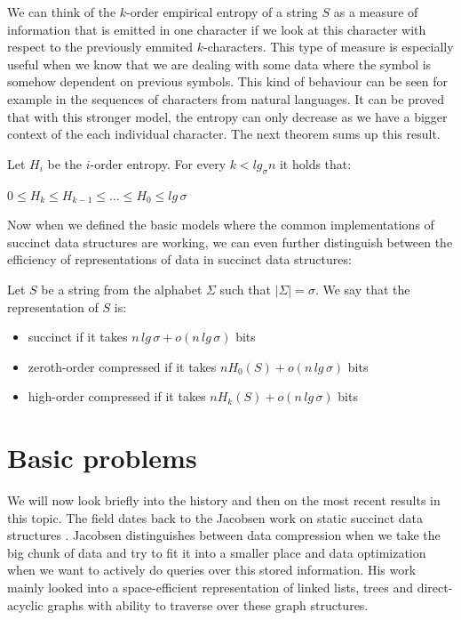 We can think of the $k$-order empirical entropy of a string $S$ as a measure of information that is emitted in one character if we look at this character with respect to the previously emmited $k$-characters. This type of measure is especially useful when we know that we are dealing with some data where the symbol is somehow dependent on previous symbols. This kind of behaviour can be seen for example in the sequences of characters from natural languages. It can be proved that with this stronger model, the entropy can only decrease as we have a bigger context of the each individual character. The next theorem sums up this result.

\begin{theorem}
Let $H_i$ be the $i$-order entropy. For every $k<lg_{\sigma}n$ it holds that:
\begin{center}
$0\leq H_{k}\leq H_{k-1}\leq \ldots\leq H_0 \leq lg\, \sigma$
\end{center}
\end{theorem}

Now when we defined the basic models where the common implementations of succinct data structures are working, we can even further distinguish between the efficiency of representations of data in succinct data structures:

\begin{theorem}
Let $S$ be a string from the alphabet $\Sigma$ such that $|\Sigma|=\sigma$. We say that the representation of $S$ is:
\begin{itemize}
    \item succinct if it takes $n\,lg\,\sigma + o(n\,lg\,\sigma)$ bits
    \item zeroth-order compressed if it takes $nH_0(S) + o(n\,lg\,\sigma)$ bits
    \item high-order compressed if it takes $nH_k(S) + o(n\,lg\,\sigma)$ bits
\end{itemize}
\end{theorem}

\section{Basic problems}

We will now look briefly into the history and then on the most recent results in this topic. The field dates back to the Jacobsen work on static succinct data structures \cite{jacobson1988succinct}. Jacobsen distinguishes between data compression when we take the big chunk of data and try to fit it into a smaller place and
data optimization when we want to actively do queries over this stored information. His work mainly looked into a space-efficient representation of linked lists, trees and direct-acyclic graphs with ability to traverse over these graph structures.

